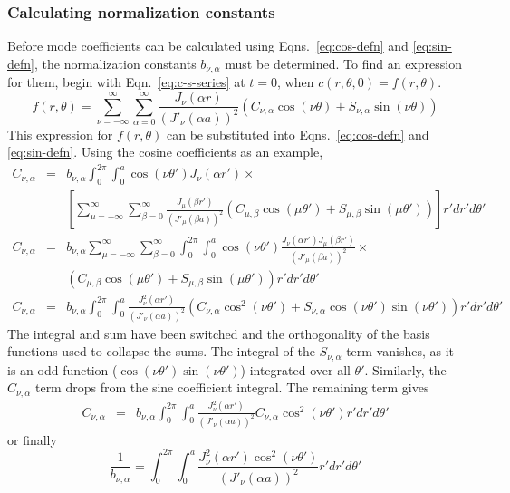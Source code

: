 \subsubsection{Calculating normalization constants}

Before mode coefficients can be calculated using Eqns.~\ref{eq:cos-defn} and \ref{eq:sin-defn}, the normalization constants $b_{\nu,\alpha}$ must be determined.  To find an expression for them, begin with Eqn.~\ref{eq:c-s-series} at $t=0$, when $c(r,\theta,0) = f(r,\theta)$.
\begin{equation}
f(r,\theta)= \sum_{\nu=-\infty}^{\infty} \sum_{\alpha = 0}^\infty   \frac{J_\nu\left(\alpha r\right)}{\left(J'_\nu (\alpha a)\right)^2} \left(C_{\nu,\alpha}\cos(\nu\theta) + S_{\nu,\alpha} \sin(\nu\theta)\right)
\label{eq:c-s-series-t-0}
\end{equation}
This expression for $f(r,\theta)$ can be substituted into Eqns.~\ref{eq:cos-defn} and \ref{eq:sin-defn}.  Using the cosine coefficients as an example,
\begin{eqnarray*}
C_{\nu,\alpha} & = &b_{\nu,\alpha} \int_0^{2\pi} \int_0^a \cos\left(\nu\theta'\right) J_\nu(\alpha r') \times\\
& &\left[\sum_{\mu=-\infty}^{\infty} \sum_{\beta = 0}^\infty   \frac{J_\mu\left(\beta r'\right)}{\left(J'_\mu (\beta a)\right)^2} \left(C_{\mu,\beta}\cos(\mu\theta') + S_{\mu,\beta} \sin(\mu\theta')\right)\right] r' dr' d\theta'\\
C_{\nu,\alpha} & = &b_{\nu,\alpha} \sum_{\mu=-\infty}^{\infty} \sum_{\beta = 0}^\infty\int_0^{2\pi} \int_0^a \cos\left(\nu\theta'\right)  \frac{ J_\nu(\alpha r')   J_\mu\left(\beta r'\right)}{\left(J'_\mu (\beta a)\right)^2} \times\\
& & \left(C_{\mu,\beta}\cos(\mu\theta') + S_{\mu,\beta} \sin(\mu\theta')\right) r' dr' d\theta'\\
C_{\nu,\alpha} & = &b_{\nu,\alpha} \int_0^{2\pi} \int_0^a  \frac{ J_\nu^2(\alpha r')}{\left(J'_\nu (\alpha a)\right)^2} \left(C_{\nu,\alpha}\cos^2(\nu\theta') + S_{\nu,\alpha}\cos\left(\nu\theta'\right)\sin(\nu\theta')\right) r' dr' d\theta'
\end{eqnarray*}
The integral and sum have been switched and the orthogonality of the basis functions used to collapse the sums.  The integral of the $S_{\nu,\alpha}$ term vanishes, as it is an odd function ($\cos\left(\nu\theta'\right)\sin(\nu\theta')$) integrated over all $\theta'$.  Similarly, the $C_{\nu,\alpha}$ term drops from the sine coefficient integral.  The remaining term gives
\begin{eqnarray*}
C_{\nu,\alpha} & = &b_{\nu,\alpha} \int_0^{2\pi} \int_0^a  \frac{ J_\nu^2(\alpha r')}{\left(J'_\nu (\alpha a)\right)^2} C_{\nu,\alpha}\cos^2(\nu\theta') r' dr' d\theta'
\end{eqnarray*} or finally
\begin{equation}
\frac{1}{b_{\nu,\alpha}}  =  \int_0^{2\pi} \int_0^a  \frac{ J_\nu^2(\alpha r')\cos^2(\nu\theta') }{\left(J'_\nu (\alpha a)\right)^2} r' dr' d\theta' \label{eq:bna-theory}
\end{equation}

